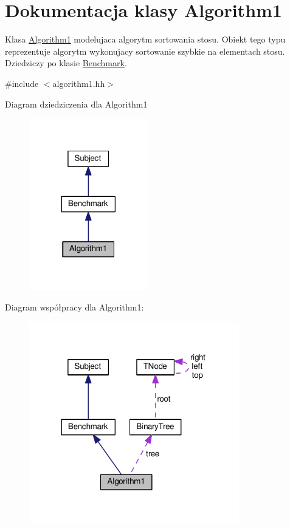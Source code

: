 \hypertarget{class_algorithm1}{\section{Dokumentacja klasy Algorithm1}
\label{class_algorithm1}
}


Klasa \hyperlink{class_algorithm1}{Algorithm1} modelujaca algorytm sortowania stosu. Obiekt tego typu reprezentuje algorytm wykonujacy sortowanie szybkie na elementach stosu. Dziedziczy po klasie \hyperlink{class_benchmark}{Benchmark}.  




{\ttfamily \#include $<$algorithm1.\-hh$>$}



Diagram dziedziczenia dla Algorithm1
\nopagebreak
\begin{figure}[H]
\begin{center}
\leavevmode
\includegraphics[width=146pt]{class_algorithm1__inherit__graph}
\end{center}
\end{figure}


Diagram współpracy dla Algorithm1\-:
\nopagebreak
\begin{figure}[H]
\begin{center}
\leavevmode
\includegraphics[width=259pt]{class_algorithm1__coll__graph}
\end{center}
\end{figure}
